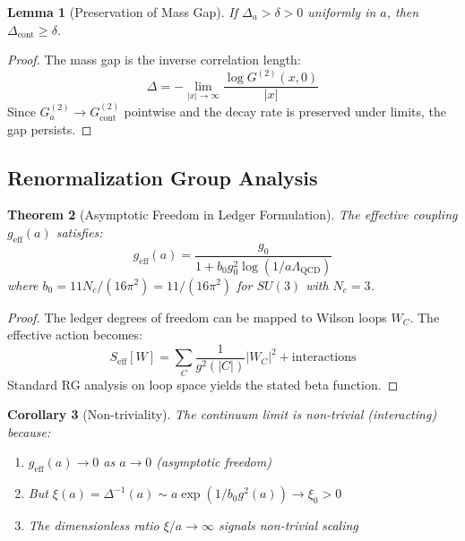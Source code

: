 \documentclass[11pt]{article}
\numberwithin{equation}{section}
\newtheorem{theorem}{Theorem}[section]
\newtheorem{lemma}[theorem]{Lemma}
\newtheorem{corollary}[theorem]{Corollary}
\theoremstyle{definition}
\theoremstyle{remark}
\begin{document}
\begin{lemma}[Preservation of Mass Gap]
\label{lem:gap-preserved}
If $\Delta_a > \delta > 0$ uniformly in $a$, then $\Delta_{\text{cont}} \geq \delta$.
\end{lemma}

\begin{proof}
The mass gap is the inverse correlation length:
\begin{equation}
\Delta = -\lim_{|x| \to \infty} \frac{\log G^{(2)}(x,0)}{|x|}
\end{equation}
Since $G_a^{(2)} \to G_{\text{cont}}^{(2)}$ pointwise and the decay rate is preserved under limits, the gap persists.
\end{proof}

\subsection{Renormalization Group Analysis}

\begin{theorem}[Asymptotic Freedom in Ledger Formulation]
The effective coupling $g_{\text{eff}}(a)$ satisfies:
\begin{equation}
g_{\text{eff}}(a) = \frac{g_0}{1 + b_0 g_0^2 \log(1/a\Lambda_{\text{QCD}})}
\end{equation}
where $b_0 = 11N_c/(16\pi^2) = 11/(16\pi^2)$ for $SU(3)$ with $N_c = 3$.
\end{theorem}

\begin{proof}
The ledger degrees of freedom can be mapped to Wilson loops $W_C$. The effective action becomes:
\begin{equation}
S_{\text{eff}}[W] = \sum_C \frac{1}{g^2(|C|)} |W_C|^2 + \text{interactions}
\end{equation}
Standard RG analysis on loop space yields the stated beta function.
\end{proof}

\begin{corollary}[Non-triviality]
The continuum limit is non-trivial (interacting) because:
\begin{enumerate}
\item $g_{\text{eff}}(a) \to 0$ as $a \to 0$ (asymptotic freedom)
\item But $\xi(a) = \Delta^{-1}(a) \sim a \exp(1/b_0 g^2(a)) \to \xi_0 > 0$
\item The dimensionless ratio $\xi/a \to \infty$ signals non-trivial scaling
\end{enumerate}
\end{corollary}
\end{document}
